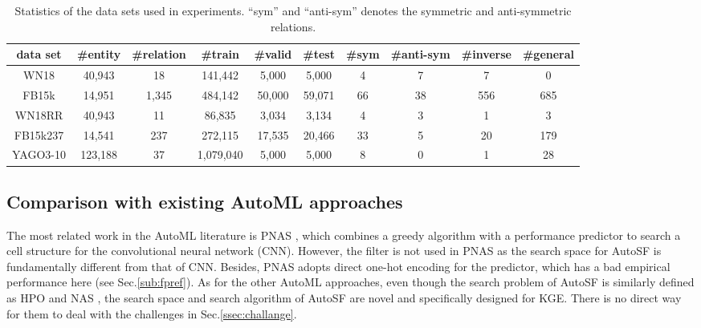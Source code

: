 \documentclass[conference]{IEEEtran}
\begin{document}
\begin{table*}[ht]
	\centering
	\caption{Statistics of the data sets used in experiments. ``sym'' and ``anti-sym'' denotes the symmetric and anti-symmetric relations.}
	\label{tab:dataset}
	\vspace{-9px}
	\begin{tabular}{c|ccccc|cccc}
		\hline
		                data set                 & \#entity & \#relation &  \#train  & \#valid & \#test & \#sym & \#anti-sym & \#inverse & \#general \\ \hline
		   WN18 \cite{bordes2013translating}     &  40,943  &     18     &  141,442  &  5,000  & 5,000  &   4   &     7      &     7     &     0     \\
		  FB15k  \cite{bordes2013translating}    &  14,951  &   1,345    &  484,142  & 50,000  & 59,071 &  66   &     38     &    556    &    685    \\
		WN18RR  \cite{dettmers2017convolutional} &  40,943  &     11     &  86,835   &  3,034  & 3,134  &   4   &     3      &     1     &     3     \\
		 FB15k237 \cite{toutanova2015observed}   &  14,541  &    237     &  272,115  & 17,535  & 20,466 &  33   &     5      &    20     &    179    \\
		 YAGO3-10 \cite{mahdisoltani2013yago3}   & 123,188  &     37     & 1,079,040 &  5,000  & 5,000  &   8   &     0      &     1     &    28     \\ \hline
	\end{tabular}
	\vspace{-5px}
\end{table*}

\subsection{Comparison with existing AutoML approaches}
The most related work in the AutoML literature is PNAS \cite{liu2018progressive},
which combines a greedy algorithm with a performance predictor to search 
a cell structure for the convolutional neural network (CNN).
However,
the filter is not used in PNAS 
as the search space for AutoSF is fundamentally different from that of CNN.
Besides,
PNAS adopts direct one-hot encoding for the predictor,
which has a bad empirical performance here (see Sec.\ref{sub:fpref}).
As for the other AutoML approaches, 
even though the search problem of AutoSF is similarly defined as HPO \cite{bergstra2011algorithms,eggensperger2015efficient}
and NAS \cite{elsken2019neural},
the search space and search algorithm of AutoSF
are novel and specifically designed for KGE.
There is no direct way for them to deal with the challenges
in Sec.\ref{ssec:challange}.
\end{document}
